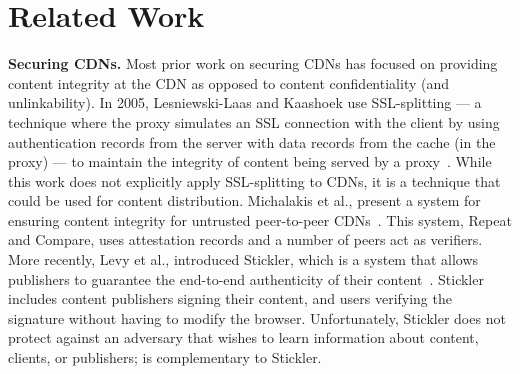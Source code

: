 \section{Related Work}
\label{sec:related}


\textbf{Securing CDNs.} Most prior work on securing CDNs has focused on providing content 
integrity at the CDN as opposed to content confidentiality (and unlinkability).  In 2005, 
Lesniewski-Laas and Kaashoek use SSL-splitting --- a technique 
where the proxy simulates an SSL connection with the client by using authentication records from 
the server with data records from the cache (in the proxy) --- to maintain the 
integrity of content being served by a proxy~\cite{lesniewski2005ssl}.  While this work does not 
explicitly apply SSL-splitting to CDNs, it is a technique that could be used for content 
distribution.  Michalakis et al., present a system for ensuring content integrity for untrusted 
peer-to-peer CDNs~\cite{michalakis2007ensuring}.  This system, Repeat and 
Compare, uses attestation records and a number of peers act as verifiers.  More recently, Levy et al., 
introduced Stickler, which is a system that allows publishers to guarantee the end-to-end 
authenticity of their content~\cite{levy2015stickler}.  Stickler includes content publishers 
signing their content, and users verifying the signature without having to modify the browser.  Unfortunately, 
Stickler does not protect against an adversary that wishes to learn information
about content, clients, 
or publishers; \system{} is complementary to Stickler.

